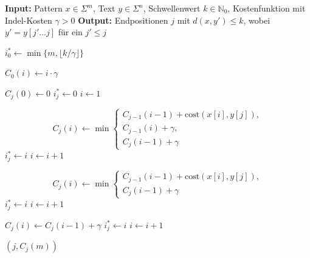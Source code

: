 \begin{algorithm}[H]
    \caption{Ukkonen's algorithm}
    \begin{algorithmic}
        \Statex \textbf{Input:} Pattern $x\in\Sigma^m$, Text $y\in\Sigma^n$, Schwellenwert $k\in\mathbb{N}_0$, Kostenfunktion mit Indel-Kosten $\gamma>0$
        \Statex \textbf{Output:} Endpositionen $j$ mit $d(x,y')\le k$, wobei $y'=y[j'\ldots j]$ für ein $j'\le j$

        \State $i_0^\ast \gets \min\{m,\lfloor k/\gamma\rfloor\}$

            \State $C_0(i) \gets i\cdot\gamma$
        \EndFor

            \State $C_j(0) \gets 0$
            \State $i_j^\ast \gets 0$
            \State $i \gets 1$

                \State
                \[
                    C_j(i)\gets
                    \min\left\{
                            \begin{array}{l}
                                C_{j-1}(i-1)+\mathrm{cost}(x[i],y[j]),\\
                                C_{j-1}(i)+\gamma,\\
                                C_j(i-1)+\gamma
                            \end{array}
                    \right.
                \]
                    \State $i_j^\ast \gets i$
                \EndIf
                \State $i \gets i+1$
            \EndWhile

                \State
                \[
                    C_j(i)\gets
                    \min\left\{
                            \begin{array}{l}
                                C_{j-1}(i-1)+\mathrm{cost}(x[i],y[j]),\\
                                C_j(i-1)+\gamma
                            \end{array}
                    \right.
                \]
                    \State $i_j^\ast \gets i$
                \EndIf
                \State $i \gets i+1$

                    \State $C_j(i)\gets C_j(i-1)+\gamma$
                        \State $i_j^\ast \gets i$
                    \EndIf
                    \State $i \gets i+1$
                \EndWhile
            \EndIf

                \State \Return $(j,C_j(m))$
            \EndIf
        \EndFor
    \end{algorithmic}\caption{Ukkonens cutoff algorithm}\label{alg:ukkonen}
\end{algorithm}


